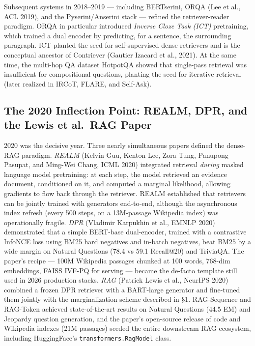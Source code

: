 \documentclass{article}
\begin{document}
Subsequent systems in 2018--2019 --- including BERTserini, ORQA (Lee et al., ACL 2019), and the Pyserini/Anserini stack --- refined the retriever-reader paradigm. ORQA in particular introduced \emph{Inverse Cloze Task (ICT)} pretraining, which trained a dual encoder by predicting, for a sentence, the surrounding paragraph. ICT planted the seed for self-supervised dense retrievers and is the conceptual ancestor of Contriever (Gautier Izacard et al., 2021). At the same time, the multi-hop QA dataset HotpotQA \citep{yang2018hotpotqaadatasetfo} showed that single-pass retrieval was insufficient for compositional questions, planting the seed for iterative retrieval (later realized in IRCoT, FLARE, and Self-Ask).

\subsection{The 2020 Inflection Point: REALM, DPR, and the Lewis et al.~RAG Paper}\label{the-2020-inflection-point-realm-dpr-and-the-lewis-et-al.-rag-paper}

2020 was the decisive year. Three nearly simultaneous papers defined the dense-RAG paradigm. \emph{REALM} (Kelvin Guu, Kenton Lee, Zora Tung, Panupong Pasupat, and Ming-Wei Chang, ICML 2020) integrated retrieval \emph{during} masked language model pretraining: at each step, the model retrieved an evidence document, conditioned on it, and computed a marginal likelihood, allowing gradients to flow back through the retriever. REALM established that retrievers can be jointly trained with generators end-to-end, although the asynchronous index refresh (every 500 steps, on a 13M-passage Wikipedia index) was operationally fragile. \emph{DPR} (Vladimir Karpukhin et al., EMNLP 2020) demonstrated that a simple BERT-base dual-encoder, trained with a contrastive InfoNCE loss using BM25 hard negatives and in-batch negatives, beat BM25 by a wide margin on Natural Questions (78.4 vs 59.1 Recall@20) and TriviaQA. The paper's recipe --- 100M Wikipedia passages chunked at 100 words, 768-dim embeddings, FAISS IVF-PQ for serving --- became the de-facto template still used in 2026 production stacks. \emph{RAG} (Patrick Lewis et al., NeurIPS 2020) combined a frozen DPR retriever with a BART-large generator and fine-tuned them jointly with the marginalization scheme described in §1. RAG-Sequence and RAG-Token achieved state-of-the-art results on Natural Questions (44.5 EM) and Jeopardy question generation, and the paper's open-source release of code and Wikipedia indexes (21M passages) seeded the entire downstream RAG ecosystem, including HuggingFace's \texttt{transformers.RagModel} class.
\end{document}
